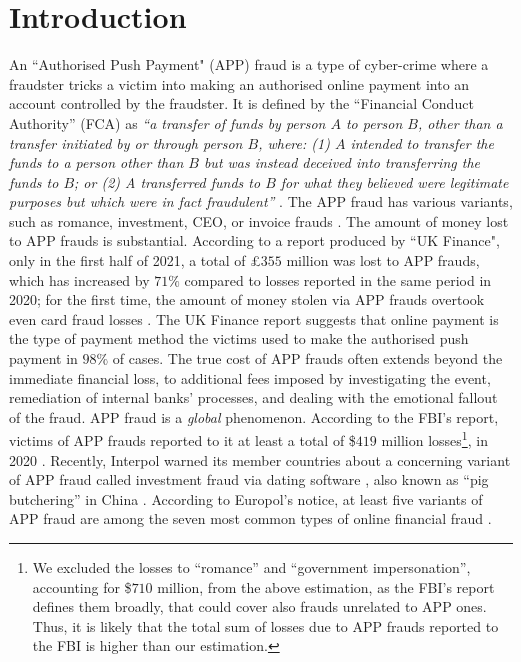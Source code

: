 

\section{Introduction}\label{sec::intro}

An  ``Authorised Push Payment" (APP) fraud is a type of cyber-crime where a fraudster tricks a victim into making an authorised online payment into an account controlled by the fraudster. It is defined by the ``Financial Conduct Authority” (FCA) as \textit{``a transfer of funds by person $A$ to person $B$, other than a transfer initiated by or through person $B$, where: (1) $A$ intended to transfer the funds to a person other than $B$ but was instead deceived into transferring the funds to $B$; or (2) A transferred funds to $B$ for what they believed were legitimate purposes but which were in fact fraudulent''} \cite{FCA-Glossary}. The APP fraud has various variants, such as romance, investment, CEO, or invoice  frauds \cite{overview-of-payment-fraud}. The amount of money lost to  APP frauds is   substantial. According to a report produced by ``UK Finance",   only in the first half of 2021, a total of £$355$ million was lost to APP frauds, which has increased by  $71\%$  compared to losses reported in the same period in 2020; for the first time, the amount of money stolen via  APP frauds overtook even   card fraud losses \cite{2021-Half-Year-Fraud-Update}. The UK Finance report suggests that  online  payment is the type of payment method the victims used to make the authorised push payment in  $98\%$  of cases. The true cost of APP frauds often extends beyond the immediate financial loss,  to additional fees imposed by  investigating the event, remediation of internal banks' processes, and  dealing with the emotional fallout of the fraud.  APP fraud is a \emph{global} phenomenon. According to  the FBI's report, victims of APP frauds reported to it at least a total of  \$$419$ million losses\footnote{We  excluded the losses to ``romance'' and ``government impersonation'', accounting for \$$710$ million, from the above estimation, as  the FBI's report defines them  broadly, that could cover also  frauds unrelated to APP ones. Thus, it is likely that the total sum of losses due to APP frauds reported to the FBI is  higher than our estimation.}, in 2020 \cite{internet-crime-report}. Recently, Interpol  warned  its member countries  about a concerning  variant of APP fraud called investment fraud via dating software \cite{interpol-notce}, also known as ``pig butchering'' in China  \cite{pig-butchering}. According to  Europol’s notice, at least five variants of APP fraud are among the seven most common types of online financial fraud \cite{europol-notice}. 





